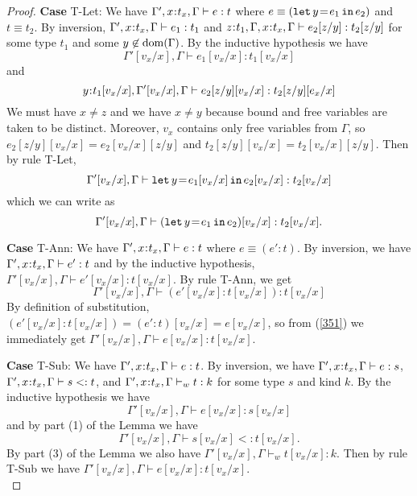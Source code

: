 \documentclass[11pt]{article}
\newcommand{\bind}{\hspace{0.05em}{:}\hspace{0.05em}} %
\newcommand{\letin}[3]{{\tt let}\,#1\hspace{0.1em}{=}\hspace{0.1em}#2\,{\tt in}\,#3}
\newcommand{\dom}[1]{{\rm dom}(#1)}
\begin{document}
\begin{proof}
{\bf Case} {\sc T-Let}: We have $\Gamma', x\bind t_x,\Gamma \vdash e : t$ where $e \equiv (\letin{y}{e_1}{e_2})$ and $t \equiv t_2$. By inversion, $\Gamma', x\bind t_x,\Gamma \vdash e_1 : t_1$ and $z\bind t_1, \Gamma,x\bind t_x,\Gamma \vdash e_2[z/y] : t_2[z/y]$ for some type $t_1$ and some $y\not\in\dom{\Gamma}$. By the inductive hypothesis we have
\begin{equation}
\Gamma'[v_x/x],\Gamma \vdash e_1[v_x/x] : t_1[v_x/x]
\end{equation} and
\begin{equation}
y\bind t_1[v_x/x], \Gamma'[v_x/x], \Gamma \vdash e_2[z/y][v_x/x] : t_2[z/y][e_x/x]
\end{equation}
We must have $x\neq z$ and we have $x \neq y$ because bound and free variables are taken to be distinct. Moreover, $v_x$ contains only free variables from $\Gamma$, so $e_2[z/y][v_x/x] = e_2[v_x/x][z/y]$ and $t_2[z/y][v_x/x] = t_2[v_x/x][z/y]$. Then by rule {\sc T-Let},
\begin{equation}
\Gamma'[v_x/x], \Gamma \vdash \letin{y}{e_1[v_x/x]}{e_2[v_x/x]} : t_2[v_x/x]
\end{equation} which we can write as \[
\Gamma'[v_x/x], \Gamma \vdash (\letin{y}{e_1}{e_2})[v_x/x]:t_2[v_x/x].
\] 

{\bf Case} {\sc T-Ann}: We have $\Gamma', x\bind t_x,\Gamma \vdash e : t$ where $e \equiv (e':t)$. By inversion, we have $\Gamma', x\bind t_x,\Gamma \vdash e' : t$ and by the inductive hypothesis, $\Gamma'[v_x/x],\Gamma \vdash e'[v_x/x] : t[v_x/x]$. By rule {\sc T-Ann}, we get
\begin{equation}\label{351}
\Gamma'[v_x/x], \Gamma \vdash (e'[v_x/x] : t[v_x/x]) : t[v_x/x]
\end{equation}
By definition of substitution, $(e'[v_x/x] : t[v_x/x]) = (e':t)[v_x/x] = e[v_x/x]$, so from (\ref{351}) we immediately get $\Gamma'[v_x/x], \Gamma \vdash e[v_x/x] : t[v_x/x]$.

{\bf Case} {\sc T-Sub}: We have $\Gamma', x\bind t_x,\Gamma \vdash e : t$. By inversion, we have $\Gamma',x\bind t_x,\Gamma \vdash e : s$,\; $\Gamma', x\bind t_x, \Gamma \vdash s <: t$, and $\Gamma',x\bind t_x,\Gamma \vdash_w t : k$ for some type $s$ and kind $k$. By the inductive hypothesis we have
\begin{equation} \label{371}
\Gamma'[v_x/x], \Gamma \vdash e[v_x/x] : s[v_x/x]
\end{equation}
and by part (1) of the Lemma we have
\begin{equation} \label{372}
\Gamma'[v_x/x],\Gamma \vdash s[v_x/x] <: t[v_x/x].
\end{equation}
By part (3) of the Lemma we also have $\Gamma'[v_x/x],\Gamma \vdash_w t[v_x/x] : k$. Then by rule {\sc T-Sub} we have $\Gamma'[v_x/x], \Gamma \vdash e[v_x/x] : t[v_x/x]$. \\


\end{proof}
\end{document}
